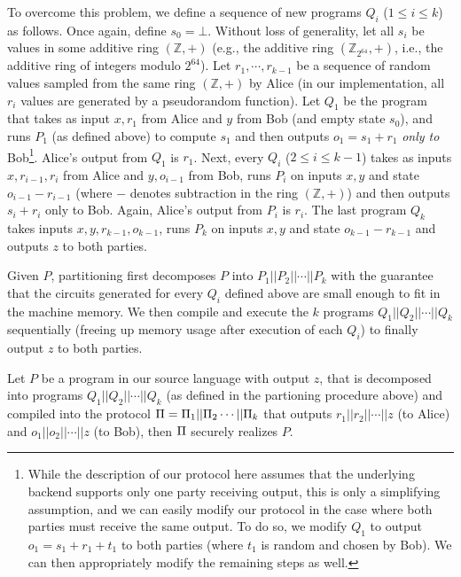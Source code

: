 To overcome this problem, we define a sequence of new programs $Q_i$ ($1\leq i\leq k$) as follows. Once again, define $s_0 = \bot$. Without loss of generality, let all $s_i$ be values in some additive ring $(\mathbb{Z},+)$ (e.g., the additive ring $(\mathbb{Z}_{2^{64}},+)$, i.e., the additive ring of integers modulo $2^{64}$). 
Let $r_1,\cdots,r_{k-1}$ be a sequence of random values sampled from the same ring $(\mathbb{Z},+)$ by Alice (in our implementation, all $r_i$ values are generated by a pseudorandom function). Let $Q_1$ be the program that takes as input $x,r_1$ from Alice and $y$ from Bob (and empty state $s_0$), and runs $P_1$ (as defined above) to compute $s_1$ and then outputs $o_1 = s_1 + r_1$ {\em only to} Bob\footnote{While the description of our protocol here assumes that the underlying backend supports only one party receiving output, this is only a simplifying assumption, and we can easily modify our protocol in the case where both parties must receive the same output. To do so, we modify $Q_1$ to output $o_1 = s_1+r_1+t_1$ to both parties (where $t_1$ is random and chosen by Bob). We can then appropriately modify the remaining steps as well.}. Alice's output from $Q_1$ is $r_1$. Next, every $Q_i$ ($2\leq i\leq k-1$) takes as inputs $x,r_{i-1},r_i$ from Alice and $y,o_{i-1}$ from Bob, runs $P_i$ on inputs $x,y$ and state $o_{i-1}-r_{i-1}$ (where $-$ denotes subtraction in the ring $(\mathbb{Z},+)$) and then outputs $s_i+r_i$ only to Bob. Again, Alice's output from $P_i$ is $r_i$. The last program $Q_k$ takes inputs $x,y,r_{k-1},o_{k-1}$, runs $P_k$ on inputs $x,y$ and state $o_{k-1}-r_{k-1}$ and outputs $z$ to both parties.

Given $P$, partitioning first decomposes $P$ into $P_1||P_2||\cdots||P_k$ with the guarantee that the circuits generated for every $Q_i$ defined above are small enough to fit in the machine memory. We then compile and execute the $k$ programs $Q_1||Q_2||\cdots||Q_k$ sequentially (freeing up memory usage after  execution of each $Q_i$) to finally output $z$ to both parties.

\begin{theorem}
Let $P$ be a program in our source language with output $z$, that is decomposed into programs $Q_1||Q_2||\cdots ||Q_k$ (as defined in the partioning procedure above) and compiled into the protocol $\Pi = \Pi_1||\Pi_2\cdots ||\Pi_k$ that outputs $r_1||r_2||\cdots||z$ (to Alice) and $o_1||o_2||\cdots||z$ (to Bob), then $\Pi$ securely realizes $P$.  
\end{theorem}

